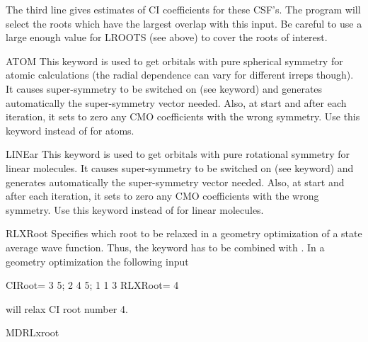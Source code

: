 \begin{keywordlist}
The third line gives estimates of CI coefficients for these CSF's.
The program will select the roots which have the largest overlap with
this input.
Be careful to use a large enough value for LROOTS (see above) to cover
the roots of interest.
\item[ATOM]
This keyword is used to get orbitals with pure spherical
symmetry for atomic calculations (the radial dependence can vary for different
irreps though). It causes super-symmetry to be
switched on (see  keyword) and generates automatically the
super-symmetry vector needed. Also, at start and after each iteration,
it sets to zero any CMO coefficients with the wrong symmetry. Use this keyword
instead of  for atoms.
\item[LINEar]
This keyword is used to get orbitals with pure rotational
symmetry for linear molecules. It causes super-symmetry to be
switched on (see  keyword) and generates automatically the
super-symmetry vector needed. Also, at start and after each iteration,
it sets to zero any CMO coefficients with the wrong symmetry. Use this keyword
instead of  for linear molecules.
\item[RLXRoot]
Specifies which root to be relaxed in a geometry optimization of a
state average wave function. Thus, the keyword has to be combined
with .
In a geometry optimization the following input
\begin{inputlisting}
CIRoot= 3 5; 2 4 5; 1 1 3
RLXRoot= 4
\end{inputlisting}
will relax CI root number 4.
\item[MDRLxroot]

\end{keywordlist}
